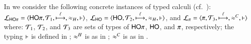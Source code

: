 \smallskip

In  %
we consider the following concrete instances of typed calculi (cf.~):
%
	$\tyl{L}_{\HOp}=\calc{\HOp}{{\cal{T}}_1}{\hby{\ell}}{\wb_H}{\proves}$,
	$\tyl{L}_{\HO}=\calc{\HO}{{\cal{T}}_2}{\hby{\ell}}{\wb_H}{\proves}$, and
	$\tyl{L}_{\sessp}=\calc{\sessp}{{\cal{T}}_3}{\hby{\ell}}{\fwb}{\proves}$ 
%
where: 
${\cal{T}}_1$, ${\cal{T}}_2$, 
and ${\cal{T}}_3$
are sets of types of $\mathsf{HO}\pi$, $\mathsf{HO}$, and $\pi$, respectively;
the typing $\vdash$ is defined in 
;  
$\approx^H$ is as in ; 
$\approx^C$ is as in .


